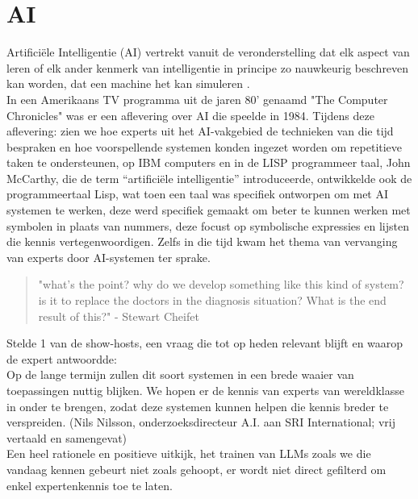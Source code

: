\section{AI}
\label{sec:ai}
Artificiële Intelligentie (AI) vertrekt vanuit de veronderstelling dat elk aspect van leren of elk ander kenmerk van intelligentie in principe zo nauwkeurig beschreven kan worden, dat een machine het kan simuleren \autocite{McCarthy1955}. \\

In een Amerikaans TV programma uit de jaren 80' genaamd "The Computer Chronicles" was er een aflevering over AI die speelde in 1984. Tijdens deze aflevering: \autocite{ComputerChronicles1984} zien we hoe experts uit het AI-vakgebied de technieken van die tijd bespraken en hoe voorspellende systemen konden ingezet worden om repetitieve taken te ondersteunen, op IBM computers en in de LISP programmeer taal, John McCarthy, die de term “artificiële intelligentie” introduceerde, ontwikkelde ook de programmeertaal Lisp, wat toen een taal was specifiek ontworpen om met AI systemen te werken, deze werd specifiek gemaakt om beter te kunnen werken met symbolen in plaats van nummers, deze focust op symbolische expressies en lijsten die kennis vertegenwoordigen. Zelfs in die tijd kwam het thema van vervanging van experts door AI-systemen ter sprake.

\begin{quote}
    "what's the point? why do we develop something like this kind of system? is it to replace the doctors in the diagnosis situation? What is the end result of this?"
    - Stewart Cheifet \autocite{ComputerChronicles1984}
\end{quote}

Stelde 1 van de show-hosts, een vraag die tot op heden relevant blijft en waarop de expert antwoordde: \\

Op de lange termijn zullen dit soort systemen in een brede waaier van toepassingen nuttig blijken. We hopen er de kennis van experts van wereldklasse in onder te brengen, zodat deze systemen kunnen helpen die kennis breder te verspreiden. (Nils Nilsson, onderzoeksdirecteur A.I. aan SRI International; vrij vertaald en samengevat)\autocite{ComputerChronicles1984} \\

Een heel rationele en positieve uitkijk, het trainen van LLMs  zoals we die vandaag kennen gebeurt niet zoals gehoopt, er wordt niet direct gefilterd om enkel expertenkennis toe te laten.

